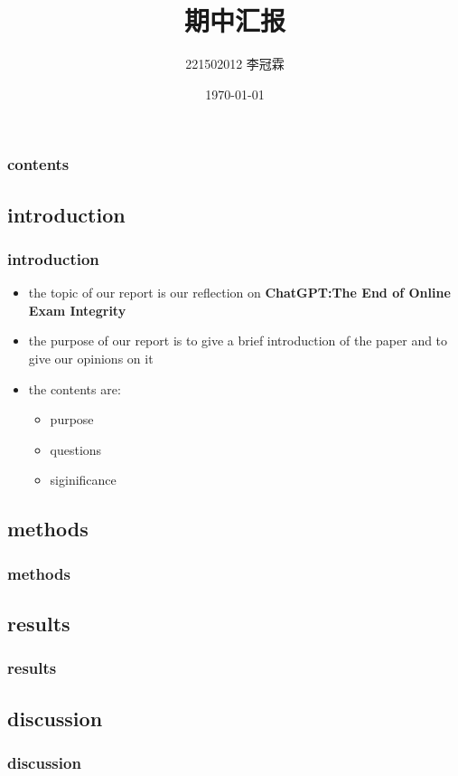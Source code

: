 \documentclass{beamer}
\title{期中汇报}
\author{221502012 李冠霖}
\date{\today}
\begin{document}
\begin{frame}
    \maketitle
\end{frame}
\begin{frame}
    \frametitle{contents}
        \tableofcontents
\end{frame}
\begin{frame}
    \section{introduction}
    \frametitle{introduction}
    \begin{itemize}
        \item the topic of our report is our reflection on  \textbf{ChatGPT:The End of Online Exam Integrity}
        \item the purpose of our report is to give a brief introduction of the paper and to give our opinions on it
        \item the contents are:
        \begin{itemize}
            \item purpose
            \item questions
            \item siginificance
        \end{itemize}
    \end{itemize}
\end{frame}
\begin{frame}
    \section{methods}
    \frametitle{methods}

\end{frame}
\begin{frame}
    \section{results}
    \frametitle{results}
\end{frame}
\begin{frame}
    \section{discussion}
    \frametitle{discussion}
\end{frame}
\end{document}
